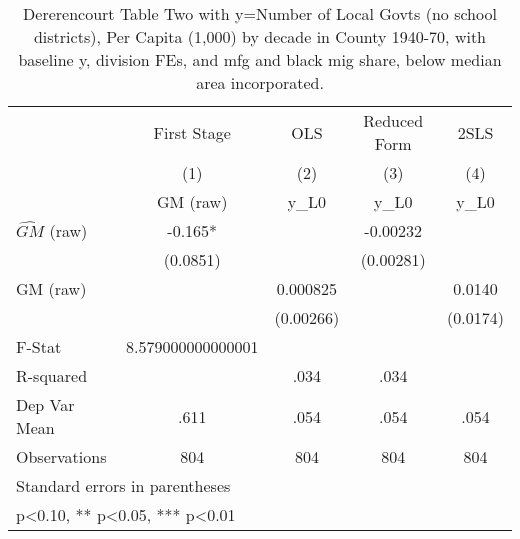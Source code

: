\begin{table}[htbp]\centering
\def\sym#1{\ifmmode^{#1}\else\(^{#1}\)\fi}
\caption{Dererencourt Table Two with y=Number of Local Govts (no school districts), Per Capita (1,000) by decade in County 1940-70, with baseline y, division FEs, and mfg and black mig share, below median area incorporated.}
\begin{tabular}{l*{4}{c}}
\toprule
                    & First Stage   &         OLS   &Reduced Form   &        2SLS   \\
                    &\multicolumn{1}{c}{(1)}&\multicolumn{1}{c}{(2)}&\multicolumn{1}{c}{(3)}&\multicolumn{1}{c}{(4)}\\
                    &\multicolumn{1}{c}{GM  (raw)}&\multicolumn{1}{c}{y\_L0}&\multicolumn{1}{c}{y\_L0}&\multicolumn{1}{c}{y\_L0}\\
\midrule
$\hat{GM}$ (raw)    &      -0.165*  &               &    -0.00232   &               \\
                    &    (0.0851)   &               &   (0.00281)   &               \\
\addlinespace
GM  (raw)           &               &    0.000825   &               &      0.0140   \\
                    &               &   (0.00266)   &               &    (0.0174)   \\
\midrule
F-Stat              &8.579000000000001   &               &               &               \\
R-squared           &               &        .034   &        .034   &               \\
Dep Var Mean        &        .611   &        .054   &        .054   &        .054   \\
Observations        &         804   &         804   &         804   &         804   \\
\bottomrule
\multicolumn{5}{l}{\footnotesize Standard errors in parentheses}\\
\multicolumn{5}{l}{\footnotesize * p<0.10, ** p<0.05, *** p<0.01}\\
\end{tabular}
\end{table}
